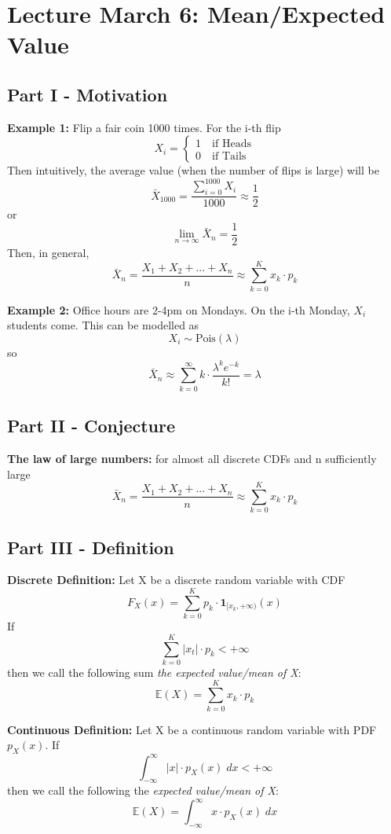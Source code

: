 \documentclass[12pt]{article}
\begin{document}
\section{Lecture March 6: Mean/Expected Value}
\subsection*{Part I - Motivation}
\textbf{Example 1:} Flip a fair coin 1000 times. For the i-th flip
\[X_i = \begin{cases}
    1 \quad \text{if Heads}\\
    0 \quad \text{if Tails}
\end{cases}\]
Then intuitively, the average value (when the number of flips is large) will be 
\[\bar{X}_{1000} = \frac{\sum_{i=0}^{1000} X_i}{1000} \approx \frac{1}{2}\]
or 
\[\lim_{n \to \infty} \bar{X}_n = \frac{1}{2}\]
Then, in general,
\[\bar{X}_n = \frac{X_1 + X_2  +... + X_n}{n} \approx \sum_{k=0}^K x_k \cdot p_k\]

\textbf{Example 2:} Office hours are 2-4pm on Mondays. On the i-th Monday, $X_i$ students come. 
This can be modelled as 
\[X_i \sim \text{Pois}(\lambda)\]
so 
\[\bar{X}_n \approx \sum_{k=0}^\infty k\cdot \frac{\lambda^k e^{-k}}{k!} = \lambda\]

\subsection*{Part II - Conjecture}
\textbf{The law of large numbers:} for almost all discrete CDFs and n sufficiently large
\[\boxed{\bar{X}_n = \frac{X_1 + X_2  +... + X_n}{n} \approx \sum_{k=0}^K x_k \cdot p_k}\]

\subsection*{Part III - Definition}
\textbf{Discrete Definition:} Let X be a discrete random variable with CDF 
\[F_X(x) = \sum_{k=0}^K p_k \cdot \mathbf{1}_{[x_k, +\infty)}(x)\]
If 
\[\sum_{k=0}^K |x_t| \cdot p_k < +\infty\]
then we call the following sum \emph{the expected value/mean of X}:
\[\mathbb{E}(X) = \sum_{k=0}^K x_k \cdot p_k\]

\textbf{Continuous Definition:} Let X be a continuous random variable with PDF $p_X(x)$. If 
\[\int_{-\infty}^{\infty} |x| \cdot p_X(x) \; dx < +\infty\]
then we call the following the \emph{expected value/mean of X}:
\[\mathbb{E}(X) = \int_{-\infty}^{\infty} x \cdot p_X(x)\; dx\]
\end{document}
